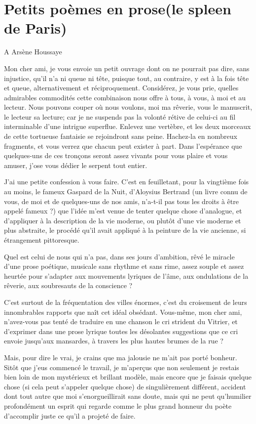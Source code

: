 \section*{Petits poèmes en prose\break (le spleen de Paris)}

A Arsène Houssaye

Mon cher ami, je vous envoie un petit ouvrage dont on ne pourrait pas
dire, sans injustice, qu’il n’a ni
queue ni tête, puisque tout, au contraire, y est à la fois tête et
queue, alternativement et réciproquement. Considérez, je vous prie,
quelles admirables commodités cette combinaison nous offre à tous, à
vous, à moi et au lecteur. Nous pouvons couper où nous voulons, moi ma
rêverie, vous le manuscrit, le lecteur sa lecture; car je ne suspends
pas la volonté rétive de celui{}-ci au fil interminable
d’une intrigue superflue. Enlevez une vertèbre, et les
deux morceaux de cette tortueuse fantaisie se rejoindront sans peine.
Hachez{}-la en nombreux fragments, et vous verrez que chacun peut
exister à part. Dans l’espérance que quelques{}-uns de
ces tronçons seront assez vivants pour vous plaire et vous amuser,
j’ose vous dédier le serpent tout entier.

J’ai une petite confession à vous faire.
C’est en feuilletant, pour la vingtième fois au moins,
le fameux Gaspard de la Nuit, d’Aloysius Bertrand (un
livre connu de vous, de moi et de quelques{}-uns de nos amis,
n’a{}-t{}-il pas tous les droits à être appelé fameux
?) que l’idée m’est venue de tenter
quelque chose d’analogue, et
d’appliquer à la description de la vie moderne, ou
plutôt d’une vie moderne et plus abstraite, le procédé
qu’il avait appliqué à la peinture de la vie ancienne,
si étrangement pittoresque.

Quel est celui de nous qui n’a pas, dans ses jours
d’ambition, rêvé le miracle d’une
prose poétique, musicale sans rhythme et sans rime, assez souple et
assez heurtée pour s’adapter aux mouvements lyriques
de l’âme, aux ondulations de la rêverie, aux
soubresauts de la conscience ?

C’est surtout de la fréquentation des villes énormes,
c’est du croisement de leurs innombrables rapports que
naît cet idéal obsédant. Vous{}-même, mon cher ami,
n’avez{}-vous pas tenté de traduire en une chanson le
cri strident du Vitrier, et d’exprimer dans une prose
lyrique toutes les désolantes suggestions que ce cri envoie
jusqu’aux mansardes, à travers les plus hautes brumes
de la rue ?

Mais, pour dire le vrai, je crains que ma jalousie ne
m’ait pas porté bonheur. Sitôt que
j’eus commencé le travail, je
m’aperçus que non seulement je restais bien loin de
mon mystérieux et brillant modèle, mais encore que je faisais quelque
chose (si cela peut s’appeler quelque chose) de
singulièrement différent, accident dont tout autre que moi
s’enorgueillirait sans doute, mais qui ne peut
qu’humilier profondément un esprit qui regarde comme
le plus grand honneur du poète d’accomplir juste ce
qu’il a projeté de faire.


